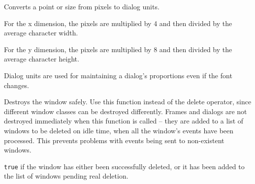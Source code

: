 \label{wxwindowconvertpixelstodialog}



Converts a point or size from pixels to dialog units.

For the x dimension, the pixels are multiplied by 4 and then divided by the average
character width.

For the y dimension, the pixels are multiplied by 8 and then divided by the average
character height.


Dialog units are used for maintaining a dialog's proportions even if the font changes.





\label{wxwindowdestroy}


Destroys the window safely. Use this function instead of the delete operator, since
different window classes can be destroyed differently. Frames and dialogs
are not destroyed immediately when this function is called -- they are added
to a list of windows to be deleted on idle time, when all the window's events
have been processed. This prevents problems with events being sent to non-existent
windows.


{\tt true} if the window has either been successfully deleted, or it has been added
to the list of windows pending real deletion.


\label{wxwindowdestroychildren}


